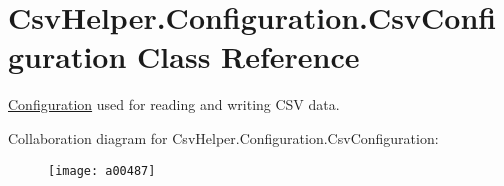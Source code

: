 \hypertarget{a00065}{\section{Csv\-Helper.\-Configuration.\-Csv\-Configuration Class Reference}
\label{a00065}
}


\hyperlink{a00341}{Configuration} used for reading and writing C\-S\-V data.  




Collaboration diagram for Csv\-Helper.\-Configuration.\-Csv\-Configuration\-:
\nopagebreak
\begin{figure}[H]
\begin{center}
\leavevmode
\texttt{[image: a00487]}
\end{center}
\end{figure}

